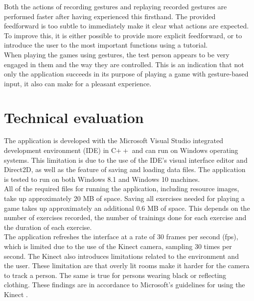 Both the actions of recording gestures and replaying recorded gestures are performed faster after having experienced this firsthand. The provided feedforward is too subtle to immediately make it clear what actions are expected. To improve this, it is either possible to provide more explicit feedforward, or to introduce the user to the most important functions using a tutorial.\\

When playing the games using gestures, the test person appears to be very engaged in them and the way they are controlled. This is an indication that not only the application succeeds in its purpose of playing a game with gesture-based input, it also can make for a pleasant experience.


\section{Technical evaluation}

The application is developed with the Microsoft Visual Studio integrated development environment (IDE) in C$++$ and can run on Windows operating systems. This limitation is due to the use of the IDE's visual interface editor and Direct2D, as well as the feature of saving and loading data files. The application is tested to run on both Windows 8.1 and Windows 10 machines.\\

All of the required files for running the application, including resource images, take up approximately 20 MB of space. Saving all exercises needed for playing a game takes up approximately an additional 0.6 MB of space. This depends on the number of exercises recorded, the number of trainings done for each exercise and the duration of each exercise.\\

The application refreshes the interface at a rate of 30 frames per second (fps), which is limited due to the use of the Kinect camera, sampling 30 times per second. The Kinect also introduces limitations related to the environment and the user. These limitation are that overly lit rooms make it harder for the camera to track a person. The same is true for persons wearing black or reflecting clothing. These findings are in accordance to Microsoft's guidelines for using the Kinect \cite{MicrosoftGuidelines}.